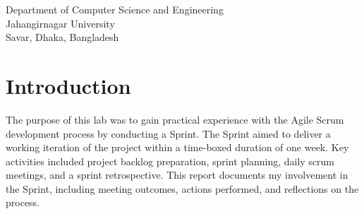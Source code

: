 \documentclass[a4paper,12pt]{article}
\begin{document}
\begin{center}
\begin{table}[h!]
\begin{tabular}{|c|c|c|c|}
        \end{tabular}
    \end{table}

    \vspace{1cm}

    Department of Computer Science and Engineering\\
    Jahangirnagar University\\
    Savar, Dhaka, Bangladesh\\
\end{center}

\newpage

\tableofcontents

\newpage
\pagestyle{fancy}
\fancyhf{}
\fancyfoot[C]{\thepage} %
\section{Introduction}
The purpose of this lab was to gain practical experience with the Agile Scrum development process by
conducting a Sprint. The Sprint aimed to deliver a working iteration of the project within a time-boxed
duration of one week. Key activities included project backlog preparation, sprint planning, daily scrum
meetings, and a sprint retrospective. This report documents my involvement in the Sprint, including meeting
outcomes, actions performed, and reflections on the process.
\newpage
\end{document}
